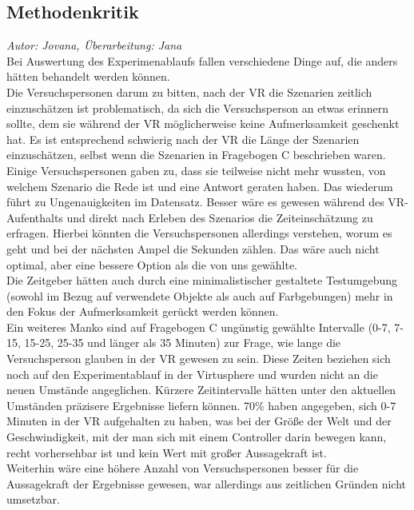 \documentclass{Bericht}
\begin{document}
\label{subsec:kritik}
\subsection{Methodenkritik}
\textit{Autor: Jovana, Überarbeitung: Jana}\\
Bei Auswertung des Experimenablaufs fallen verschiedene Dinge auf, die anders hätten behandelt werden können.\\
Die Versuchspersonen darum zu bitten, nach der VR die Szenarien zeitlich einzuschätzen ist problematisch, da sich die Versuchsperson an etwas erinnern sollte, dem sie während der VR möglicherweise keine Aufmerksamkeit geschenkt hat.
 Es ist entsprechend schwierig nach der VR die Länge der Szenarien einzuschätzen, selbst wenn die Szenarien in Fragebogen C beschrieben waren. Einige Versuchspersonen gaben zu, dass sie teilweise nicht mehr wussten, von welchem Szenario die Rede ist und eine Antwort geraten haben. Das wiederum führt zu Ungenauigkeiten im Datensatz. 
 Besser wäre es gewesen während des VR-Aufenthalts und direkt nach Erleben des Szenarios die Zeiteinschätzung zu erfragen. Hierbei könnten die Versuchspersonen allerdings verstehen, worum es geht und bei der nächsten Ampel die Sekunden zählen. Das wäre auch nicht optimal, aber eine bessere Option als die von uns gewählte.\\
Die Zeitgeber hätten auch durch eine minimalistischer gestaltete Testumgebung (sowohl im Bezug auf verwendete Objekte als auch auf Farbgebungen) mehr in den Fokus der Aufmerksamkeit gerückt werden können.\\
Ein weiteres Manko sind auf Fragebogen C ungünstig gewählte Intervalle (0-7, 7-15, 15-25, 25-35 und länger als 35 Minuten) zur Frage, wie lange die Versuchsperson glauben in der VR gewesen zu sein. Diese Zeiten beziehen sich noch auf den Experimentablauf in der Virtusphere und wurden nicht an die neuen Umstände angeglichen. 
Kürzere Zeitintervalle hätten unter den aktuellen Umständen präzisere Ergebnisse liefern können. 70\% haben angegeben, sich 0-7 Minuten in der VR aufgehalten zu haben, was bei der Größe der Welt und der Geschwindigkeit, mit der man sich mit einem Controller darin bewegen kann, recht vorhersehbar ist und kein Wert mit großer Aussagekraft ist.\\
Weiterhin wäre eine höhere Anzahl von Versuchspersonen besser für die Aussagekraft der Ergebnisse gewesen, war allerdings aus zeitlichen Gründen nicht umsetzbar.
\end{document}
